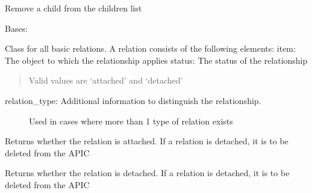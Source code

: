 \documentclass[letterpaper,10pt,english]{sphinxmanual}
\begin{document}
\begin{fulllineitems}
\begin{fulllineitems}
\end{fulllineitems}


\begin{fulllineitems}
\label{acibaseobject:acibaseobject.BaseACIObject.remove_child}
Remove a child from the children list

\end{fulllineitems}


\end{fulllineitems}


\begin{fulllineitems}
\label{acibaseobject:acibaseobject.BaseRelation}
Bases: 

Class for all basic relations.
A relation consists of the following elements:
item:    The object to which the relationship applies
status:  The status of the relationship
\begin{quote}

Valid values are `attached' and `detached'
\end{quote}
\begin{description}
\item[{relation\_type:   Additional information to distinguish the relationship.}] \leavevmode
Used in cases where more than 1 type of relation exists

\end{description}

\begin{fulllineitems}
\label{acibaseobject:acibaseobject.BaseRelation.is_attached}
Returns whether the relation is attached.
If a relation is detached, it is to be deleted from the APIC

\end{fulllineitems}


\begin{fulllineitems}
\label{acibaseobject:acibaseobject.BaseRelation.is_detached}
Returns whether the relation is detached.
If a relation is detached, it is to be deleted from the APIC


\end{fulllineitems}
\end{fulllineitems}
\end{document}
